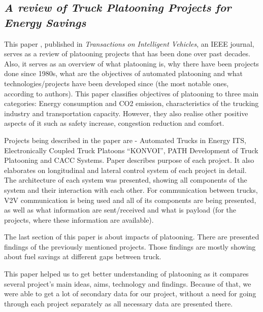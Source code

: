 \subsection{\textit{A review of Truck Platooning Projects for Energy Savings}}

This paper \cite{Tsugawa2016ASavings}, published in \emph{Transactions on Intelligent Vehicles}, an IEEE journal, serves as a review of platooning projects that has been done over past decades. Also, it serves as an overview of what platooning is, why there have been projects done since 1980s, what are the objectives of automated platooning and what technologies/projects have been developed since (the most notable ones, according to authors).
This paper classifies objectives of platooning to three main categories: Energy consumption and CO2 emission, characteristics of the trucking industry and transportation capacity. However, they also realise other positive aspects of it such as safety increase, congestion reduction and comfort.\par
% 
Projects being described in the paper are - Automated Trucks in Energy ITS, Electronically Coupled Truck Platoons “KONVOI”, PATH Development of Truck Platooning and CACC Systems. Paper describes purpose of each project. It also elaborates on longitudinal and lateral control system of each project in detail. The architecture of each system was presented, showing all components of the system and their interaction with each other. For communication between trucks, V2V communication is being used and all of its components are being presented, as well as what information are sent/received and what is payload (for the projects, where these information are available).\par
% 
The last section of this paper is about impacts of platooning. There are presented findings of the previously mentioned projects. Those findings are mostly showing about fuel savings at different gaps between truck.\par
% 
This paper helped us to get better understanding of platooning as it compares several project’s main ideas, aims, technology and findings. Because of that, we were able to get a lot of secondary data for our project, without a need for going through each project separately as all necessary data are presented there.
